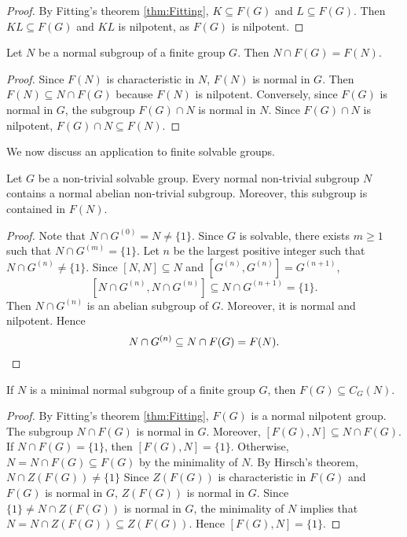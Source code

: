 \begin{proof}
By Fitting's theorem \ref{thm:Fitting}, $K\subseteq F(G)$ and 
$L\subseteq F(G)$. Then $KL\subseteq F(G)$ and $KL$ is nilpotent, as 
$F(G)$ is nilpotent. 
\end{proof}

\begin{corollary}
\label{cor:McapF(G)}
Let $N$ be a normal subgroup of a finite group $G$. Then 
$N\cap F(G)=F(N)$.
\end{corollary}

\begin{proof}
Since $F(N)$ is characteristic in $N$, $F(N)$ is normal in $G$. Then 
$F(N)\subseteq N\cap F(G)$ because $F(N)$ is nilpotent.  
Conversely, since $F(G)$ is normal in $G$, the subgroup $F(G)\cap N$ is normal in $N$. Since $F(G)\cap N$
is nilpotent, $F(G)\cap N\subseteq F(N)$. 
\end{proof}

We now discuss an application to finite solvable groups.

\begin{theorem}
Let $G$ be a non-trivial solvable group. Every normal non-trivial subgroup $N$ 
contains a normal abelian non-trivial subgroup. Moreover, this subgroup is contained in $F(N)$. 
\end{theorem}

\begin{proof}
Note that $N\cap G^{(0)}=N\ne\{1\}$. Since $G$ is solvable, there exists 
$m\geq1$ such that $N\cap G^{(m)}=\{1\}$. Let $n$ be the largest positive integer such that 
$N\cap G^{(n)}\ne\{1\}$. Since $[N,N]\subseteq N$ and $[G^{(n)},G^{(n)}]=G^{(n+1)}$, 
\[
[N\cap G^{(n)},N\cap G^{(n)}]\subseteq N\cap G^{(n+1)}=\{1\}.
\]
Then $N\cap G^{(n)}$ is an abelian subgroup of $G$. Moreover, it is normal and 
nilpotent. Hence 
\[
N\cap G^{(n)}\subseteq N\cap F(G)=F(N).\qedhere
\]
\end{proof}

\begin{theorem}
\label{thm:F(G)centraliza}
If $N$ is a minimal normal subgroup of a finite group $G$, then 
$F(G)\subseteq C_G(N)$.
\end{theorem}

\begin{proof}
By Fitting's theorem \ref{thm:Fitting}, $F(G)$ is a normal nilpotent group. 
The subgroup $N\cap F(G)$ is normal in $G$. Moreover, 
$[F(G),N]\subseteq N\cap F(G)$. If $N\cap F(G)=\{1\}$, then
$[F(G),N]=\{1\}$. Otherwise, $N=N\cap F(G)\subseteq F(G)$ by the minimality of $N$. 
By Hirsch's theorem, $N\cap Z(F(G))\ne \{1\}$ 
Since $Z(F(G))$ is characteristic in $F(G)$ and 
$F(G)$ is normal in $G$, $Z(F(G))$ is normal in $G$. Since $\{1\}\ne N\cap Z(F(G))$ is 
normal in $G$, the minimality of $N$ implies that 
$N=N\cap Z(F(G))\subseteq
Z(F(G))$. Hence $[F(G),N]=\{1\}$. 
\end{proof}

